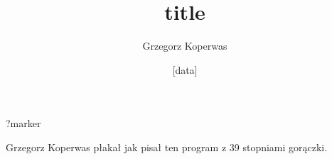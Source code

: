\documentclass[a4paper,10pt]{article}
\title{title}
\author{Grzegorz Koperwas}
\date{[data]}
\begin{document}
\begin{multicols}{3}
?marker
\end{multicols}

Grzegorz Koperwas płakał jak pisał ten program z 39 stopniami gorączki.
\end{document}
